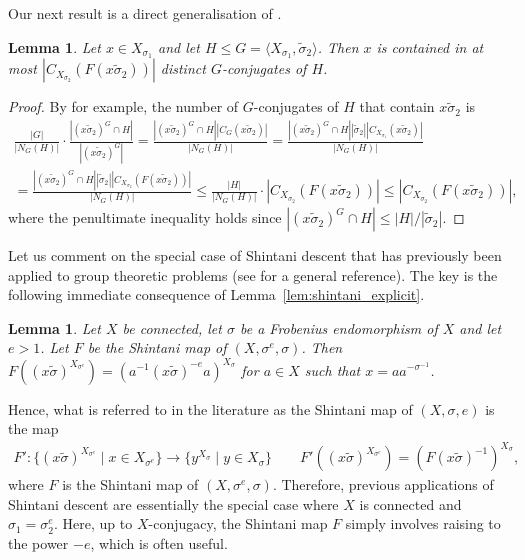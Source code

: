 \documentclass[11pt]{article}
\numberwithin{equation}{section}
\theoremstyle{shdefinition}
\theoremstyle{shplain}
\newtheorem{lemma}[definition]{Lemma}
\newcommand{\s}{\sigma}
\newcommand{\ws}{\widetilde{\sigma}}
\newcommand{\<}{\langle}
\renewcommand{\>}{\rangle}
\renewcommand{\leq}{\leqslant}
\renewcommand{\:}{\colon}
\begin{document}
Our next result is a direct generalisation of \cite[Lemma~3.3.4]{ref:Harper}.

\begin{lemma} \label{lem:shintani_centraliser}
Let $x \in X_{\s_1}$ and let $H \leq G = \< X_{\s_1}, \ws_2 \>$. Then $x$ is contained in at most $|C_{X_{\s_2}}(F(x\ws_2))|$ distinct $G$-conjugates of $H$.
\end{lemma}

\begin{proof}
By \cite[Lemma~2.1.2]{ref:Harper} for example, the number of $G$-conjugates of $H$ that contain $x\ws_2$ is
\begin{gather*}
\frac{|G|}{|N_G(H)|} \cdot \frac{|(x\ws_2)^G \cap H|}{|(x\ws_2)^G|} = \frac{|(x\ws_2)^G \cap H||C_G(x\ws_2)|}{|N_G(H)|} = \frac{|(x\ws_2)^G \cap H||\ws_2||C_{X_{\s_1}}(x\ws_2)|}{|N_G(H)|} \\ = \frac{|(x\ws_2)^G \cap H||\ws_2||C_{X_{\s_2}}(F(x\ws_2))|}{|N_G(H)|} \leq \frac{|H|}{|N_G(H)|} \cdot |C_{X_{\s_2}}(F(x\ws_2))| \leq |C_{X_{\s_2}}(F(x\ws_2))|,
\end{gather*}
where the penultimate inequality holds since $|(x\ws_2)^G \cap H| \leq |H|/|\ws_2|$.
\end{proof}


Let us comment on the special case of Shintani descent that has previously been applied to group theoretic problems (see \cite[Chapter~3]{ref:Harper} for a general reference). The key is the following immediate consequence of Lemma~\ref{lem:shintani_explicit}.

\begin{lemma} \label{lem:shintani_power}
Let $X$ be connected, let $\s$ be a Frobenius endomorphism of $X$ and let $e > 1$. Let $F$ be the Shintani map of $(X,\s^e,\s)$. Then $F((x\ws)^{X_{\s^e}}) = (a^{-1}(x\ws)^{-e}a)^{X_\s}$ for $a \in X$ such that $x = aa^{-\s^{-1}}$.
\end{lemma}

Hence, what is referred to in the literature as the Shintani map of $(X,\s,e)$ is the map 
\begin{gather*}
F'\: \{ (x\ws)^{X_{\s^e}} \mid x \in X_{\s^e} \} \to \{ y^{X_{\s}} \mid y \in X_{\s} \} \qquad F'((x\ws)^{X_{\s^e}}) = (F(x\ws)^{-1})^{X_{\s}},
\end{gather*}
where $F$ is the Shintani map of $(X,\s^e,\s)$. Therefore, previous applications of Shintani descent are essentially the special case where $X$ is connected and $\s_1 = \s_2^e$. Here, up to $X$-conjugacy, the Shintani map $F$ simply involves raising to the power $-e$, which is often useful.
\end{document}
